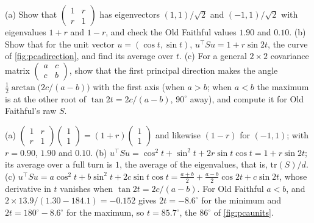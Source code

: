 \begin{exercise}
\label{ex:pca-twobytwo}
(a) Show that $\begin{pmatrix} 1 & r \\ r & 1\end{pmatrix}$ has eigenvectors $(1, 1)/\sqrt2$ and $(-1, 1)/\sqrt2$ with eigenvalues $1 + r$ and $1 - r$, and check the Old Faithful values $1.90$ and $0.10$. (b) Show that for the unit vector $u = (\cos t, \sin t)$, $u^\top Su = 1 + r\sin 2t$, the curve of \cref{fig:pcadirection}, and find its average over $t$. (c) For a general $2 \times 2$ covariance matrix $\begin{pmatrix} a & c \\ c & b\end{pmatrix}$, show that the first principal direction makes the angle $\frac12\arctan\big(2c/(a - b)\big)$ with the first axis (when $a > b$; when $a < b$ the maximum is at the other root of $\tan 2t = 2c/(a - b)$, $90^\circ$ away), and compute it for Old Faithful's raw $S$.
\end{exercise}
\begin{solution}
(a) $\begin{pmatrix} 1 & r \\ r & 1\end{pmatrix}\begin{pmatrix} 1 \\ 1\end{pmatrix} = (1 + r)\begin{pmatrix} 1 \\ 1\end{pmatrix}$ and likewise $(1 - r)$ for $(-1, 1)$; with $r = 0.90$, $1.90$ and $0.10$. (b) $u^\top Su = \cos^2t + \sin^2t + 2r\sin t\cos t = 1 + r\sin 2t$; its average over a full turn is $1$, the average of the eigenvalues, that is, $\mathrm{tr}(S)/d$. (c) $u^\top Su = a\cos^2t + b\sin^2t + 2c\sin t\cos t = \frac{a + b}{2} + \frac{a - b}{2}\cos 2t + c\sin 2t$, whose derivative in $t$ vanishes when $\tan 2t = 2c/(a - b)$. For Old Faithful $a < b$, and $2 \times 13.9/(1.30 - 184.1) = -0.152$ gives $2t = -8.6^\circ$ for the minimum and $2t = 180^\circ - 8.6^\circ$ for the maximum, so $t = 85.7^\circ$, the $86^\circ$ of \cref{fig:pcaunits}.
\end{solution}

